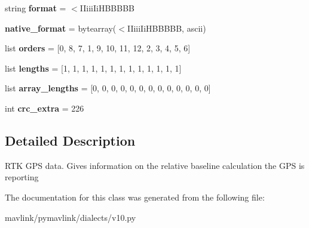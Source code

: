 \begin{DoxyCompactItemize}
\item 
\mbox{\label{classpymavlink_1_1dialects_1_1v10_1_1MAVLink__gps2__rtk__message_a87f85b95e562b7d4891921e58c8e6b87}} 
string {\bfseries format} = \textquotesingle{}$<$I\+Iiii\+Ii\+H\+B\+B\+B\+BB\textquotesingle{}
\item 
\mbox{\label{classpymavlink_1_1dialects_1_1v10_1_1MAVLink__gps2__rtk__message_a5c3bb47d8ea2414b4285b4c37fd6d4b5}} 
{\bfseries native\+\_\+format} = bytearray(\textquotesingle{}$<$I\+Iiii\+Ii\+H\+B\+B\+B\+BB\textquotesingle{}, \textquotesingle{}ascii\textquotesingle{})
\item 
\mbox{\label{classpymavlink_1_1dialects_1_1v10_1_1MAVLink__gps2__rtk__message_a8f69b64b1deedf4be05c5c439977e027}} 
list {\bfseries orders} = \mbox{[}0, 8, 7, 1, 9, 10, 11, 12, 2, 3, 4, 5, 6\mbox{]}
\item 
\mbox{\label{classpymavlink_1_1dialects_1_1v10_1_1MAVLink__gps2__rtk__message_af82f09d33f5f1327253be7a46cb5b290}} 
list {\bfseries lengths} = \mbox{[}1, 1, 1, 1, 1, 1, 1, 1, 1, 1, 1, 1, 1\mbox{]}
\item 
\mbox{\label{classpymavlink_1_1dialects_1_1v10_1_1MAVLink__gps2__rtk__message_adc71ece9baf495428ea74cf24be9c88a}} 
list {\bfseries array\+\_\+lengths} = \mbox{[}0, 0, 0, 0, 0, 0, 0, 0, 0, 0, 0, 0, 0\mbox{]}
\item 
\mbox{\label{classpymavlink_1_1dialects_1_1v10_1_1MAVLink__gps2__rtk__message_a669505f5305893160e25aa8bea04c99f}} 
int {\bfseries crc\+\_\+extra} = 226
\end{DoxyCompactItemize}


\subsection{Detailed Description}
\begin{DoxyVerb}RTK GPS data. Gives information on the relative baseline
calculation the GPS is reporting
\end{DoxyVerb}
 

The documentation for this class was generated from the following file\+:\begin{DoxyCompactItemize}
\item 
mavlink/pymavlink/dialects/v10.\+py\end{DoxyCompactItemize}
